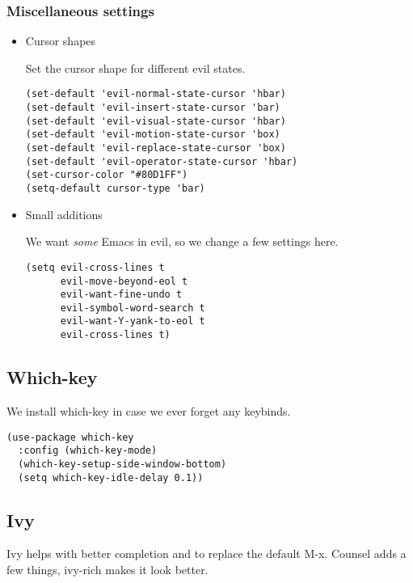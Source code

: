 \documentclass[11pt]{article}
\begin{document}
\subsubsection*{Miscellaneous settings}
\label{sec:orgde5cf85}

\begin{itemize}
\item Cursor shapes
\label{sec:orgdf86601}

Set the cursor shape for different evil states.

\begin{verbatim}
(set-default 'evil-normal-state-cursor 'hbar)
(set-default 'evil-insert-state-cursor 'bar)
(set-default 'evil-visual-state-cursor 'hbar)
(set-default 'evil-motion-state-cursor 'box)
(set-default 'evil-replace-state-cursor 'box)
(set-default 'evil-operator-state-cursor 'hbar)
(set-cursor-color "#80D1FF")
(setq-default cursor-type 'bar) 
\end{verbatim}

\item Small additions
\label{sec:orgd1636ae}

We want \emph{some} Emacs in evil, so we change a few settings here.

\begin{verbatim}
(setq evil-cross-lines t
      evil-move-beyond-eol t
      evil-want-fine-undo t
      evil-symbol-word-search t
      evil-want-Y-yank-to-eol t
      evil-cross-lines t)
\end{verbatim}
\end{itemize}

\subsection*{Which-key}
\label{sec:org9398979}

We install which-key in case we ever forget any keybinds.

\begin{verbatim}
(use-package which-key
  :config (which-key-mode)
  (which-key-setup-side-window-bottom)
  (setq which-key-idle-delay 0.1))
\end{verbatim}

\subsection*{Ivy}
\label{sec:org02864a8}

Ivy helps with better completion and to replace the default M-x. Counsel adds a few things, ivy-rich makes it look better.
\end{document}
